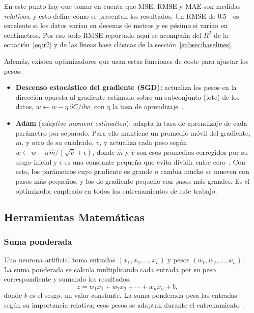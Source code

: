 \documentclass[titlepage,11pt]{article}
\providecommand{\num}[1]{\ensuremath{#1}}
\begin{document}
En este punto hay que tomar en cuenta que MSE, RMSE y MAE son medidas
\emph{relativas}, y esto define cómo se presentan los resultados. Un RMSE de
\num{0.5}~\meter\ es excelente si los datos varían en decenas de metros y es
pésimo si varían en centímetros. Por eso todo RMSE reportado aquí se acompaña
del $R^2$ de la ecuación~\eqref{eq:r2} y de las líneas base clásicas de la
sección~\ref{subsec:baselines}.

Además, existen optimizadores que usan estas funciones de coste para ajustar
los pesos:
\begin{itemize}
\item \textbf{Descenso estocástico del gradiente (SGD):} actualiza los pesos en
  la dirección opuesta al gradiente estimado sobre un subconjunto (lote) de los
  datos, $w \leftarrow w - \eta\,\partial C/\partial w$, con $\eta$ la tasa de
  aprendizaje~\cite{goodfellow_2016_deep}.
\item \textbf{Adam} (\emph{adaptive moment estimation}): adapta la tasa de
  aprendizaje de cada parámetro por separado. Para ello mantiene un promedio
  móvil del gradiente, $m$, y otro de su cuadrado, $v$, y actualiza cada peso
  según $w \leftarrow w - \eta\,\hat m/(\sqrt{\hat v}+\epsilon)$, donde $\hat m$
  y $\hat v$ son esos promedios corregidos por su sesgo inicial y $\epsilon$ es
  una constante pequeña que evita dividir entre cero~\cite{kingma_2015_adam}.
  Con esto, los parámetros cuyo gradiente es grande o cambia mucho se mueven
  con pasos más pequeños, y los de gradiente pequeño con pasos más grandes. Es el optimizador
  empleado en todos los entrenamientos de este trabajo.
\end{itemize}

\subsection{Herramientas Matemáticas}
\label{subsec:mat}

\subsubsection{Suma ponderada}
Una neurona artificial toma entradas $(x_1,x_2,\ldots,x_n)$ y pesos
$(w_1,w_2,\ldots,w_n)$. La suma ponderada se calcula multiplicando cada
entrada por su peso correspondiente y sumando los resultados,
\begin{equation}
  z = w_1x_1 + w_2x_2 + \cdots + w_nx_n + b,
\end{equation}
donde $b$ es el sesgo, un valor constante. La suma ponderada pesa las entradas
según su importancia relativa; esos pesos se adaptan durante el
entrenamiento~\cite{triola_2018_estadstica}.
\end{document}
